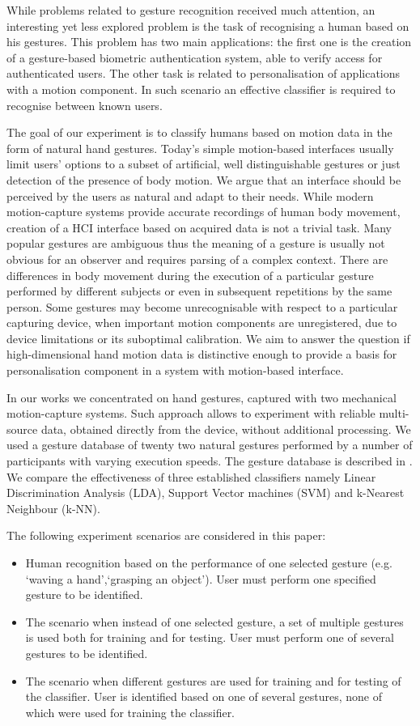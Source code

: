 \documentclass[]{article}
\begin{document}
While problems related to gesture recognition received much attention, an
interesting yet less explored problem is the task of recognising a human based
on his gestures. This problem has two main applications: the first one is the
creation of a gesture-based biometric authentication system, able to verify
access for authenticated users. The other task is related to personalisation of
applications with a motion component. In such scenario an effective classifier
is required to recognise between known users.

The goal of our experiment is to classify humans based on motion data in the
form of natural hand  gestures. Today's simple motion-based interfaces usually
limit users' options to a subset of artificial, well distinguishable gestures or
just detection of the presence of body motion. We argue that an interface should
be perceived by the users as natural and adapt to their needs. While modern motion-capture systems provide accurate recordings of human
body movement, creation of a HCI interface based on acquired data is not a
trivial task. Many popular gestures are ambiguous thus the meaning of a gesture
is usually not obvious for an observer and requires parsing of a complex
context. There are differences in body movement during the execution of a
particular gesture performed by different subjects or even in subsequent
repetitions by the same person. Some gestures may become unrecognisable with
respect to a particular capturing device, when important motion components are
unregistered, due to device limitations or its suboptimal calibration. We aim to
answer the question if high-dimensional hand motion data is distinctive enough
to provide a basis for personalisation component in a system with motion-based
interface.

In our works we concentrated on hand gestures, captured with two mechanical
motion-capture systems. Such approach allows to experiment with reliable
multi-source data, obtained directly from the device, without additional
processing. We used a gesture database of twenty two natural gestures performed
by a number of participants with varying execution speeds. The gesture database
is described in \cite{Glomb:2011}. We compare the effectiveness of three
established classifiers namely Linear Discrimination Analysis (LDA), Support
Vector machines (SVM) and k-Nearest Neighbour (k-NN). 

The following experiment scenarios are considered in this paper:
\begin{itemize}
\item Human recognition based on the performance of one selected gesture (e.g. 
`waving a hand',`grasping an object'). User must perform one specified gesture 
to be identified.
\item The scenario when instead of one selected gesture, a set of multiple 
gestures is used both for training and for testing. User must perform one of 
several gestures to be identified.
\item The scenario when different gestures are used for training and for 
testing of the classifier. User is identified based on one of several gestures, 
none of which were used for training the classifier.
\end{itemize}
\end{document}
